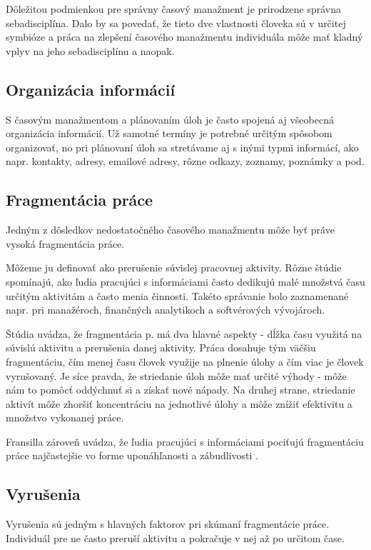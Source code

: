 \documentclass[10pt,slovak,a4paper]{article}
\begin{document}
		Dôležitou podmienkou pre správny časový manažment je prirodzene správna sebadisciplína. Dalo by sa povedať, že tieto dve vlastnosti človeka sú v určitej symbióze a práca na zlepšení časového manažmentu individuála môže mať kladný vplyv na jeho sebadisciplínu a naopak.
		
	\subsection{Organizácia informácií}
	
		S časovým manažmentom a plánovaním úloh je často spojená aj všeobecná organizácia informácií. Už samotné termíny je potrebné určitým spôsobom organizovať, no pri plánovaní úloh sa stretávame aj s inými typmi informácí, ako napr. kontakty, adresy, emailové adresy, rôzne odkazy, zoznamy, poznámky a pod.
	
	\subsection{Fragmentácia práce}
		Jedným z dôsledkov nedostatočného časového manažmentu môže byť práve vysoká fragmentácia práce.
		
		Môžeme ju definovať ako prerušenie súvislej pracovnej aktivity. Rôzne štúdie spomínajú, ako ľudia pracujúci s informáciami často dedikujú malé množstvá času určitým aktivitám a často menia činnosti. Takéto správanie bolo zaznamenané napr. pri manažéroch, finančných analytikoch a softvérových vývojároch\cite{NoTask}.
		
		Štúdia\cite{NoTask} uvádza, že fragmentácia p. má dva hlavné aspekty - dĺžka času využitá na súvislú aktivitu a prerušenia danej aktivity. Práca dosahuje tým väčšiu fragmentáciu, čím menej času človek využije na plnenie úlohy a čím viac je človek vyrušovaný. Je síce pravda, že striedanie úloh môže mať určité výhody - môže nám to pomôcť oddýchnuť si a získať nové nápady. Na druhej strane, striedanie aktivít môže zhoršiť koncentráciu na jednotlivé úlohy a môže znížiť efektivitu a množstvo vykonanej práce\cite{NoTask}.
		
		Fransilla zároveň uvádza, že ľudia pracujúci s informáciami pociťujú fragmentáciu práce najčastejšie vo forme uponáhľanosti a zábudlivosti \cite{Franssila}.
		
	\subsection{Vyrušenia}
		Vyrušenia sú jedným s hlavných faktorov pri skúmaní fragmentácie práce. Individuál pre ne často preruší aktivitu a pokračuje v nej až po určitom čase.
		
\end{document}
